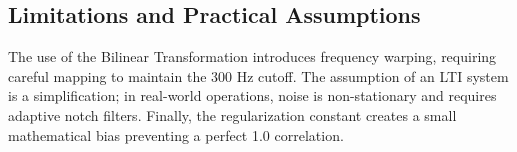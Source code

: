 \subsection{Limitations and Practical Assumptions}
The use of the Bilinear Transformation introduces frequency warping, requiring careful mapping to maintain the 300 Hz cutoff. The assumption of an LTI system is a simplification; in real-world operations, noise is non-stationary and requires adaptive notch filters. Finally, the regularization constant creates a small mathematical bias preventing a perfect 1.0 correlation.


